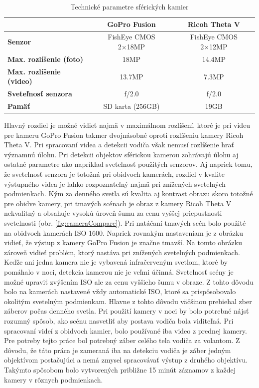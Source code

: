 \documentclass[slovak,master,dept460,male,cpp,cpdeclaration]{diploma}
\begin{document}
\begin{table}[H]
\begin{tabular}{|l|c|c|}
\hline
                                     & \textbf{GoPro Fusion}  & \textbf{Ricoh Theta V} \\ \hline
\textbf{Senzor}                      & FishEye CMOS 2×18MP    & FishEye CMOS 2×12MP    \\ \hline
\textbf{Max. rozlíšenie (foto)}      & 18MP                   & 14.4MP                 \\ \hline
\textbf{Max. rozlíšenie (video)}     & 13.7MP                 & 7.3MP                  \\ \hline
\textbf{Sveteľnosť senzora}          &  f/2.0                 & f/2.0                  \\ \hline
\textbf{Pamäť}                       &  SD karta (256GB)      & 19GB                   \\ \hline
\end{tabular}

	\caption{Technické parametre sférických kamier}
	\label{tab:techSpec}
\end{table}
\newpage
 Hlavný rozdiel je možné vidieť najmä v maximálnom rozlíšení, ktoré je pri videu pre kameru GoPro Fusion takmer dvojnásobné oproti rozlíšeniu kamery Ricoh Theta V. Pri spracovaní videa a detekcii vodiča však nemusí rozlíšenie hrať významnú úlohu. Pri detekcii objektov sférickou kamerou zohrávajú úlohu aj ostatné parametre ako napríklad svetelnosť použitých senzorov. Aj napriek tomu, že svetelnosť senzora je totožná pri obidvoch kamerách, rozdiel v kvalite výstupného videa je ľahko rozpoznateľný najmä pri znížených svetelných podmienkach. Kým za denného svetla sú kvalita aj kontrast obrazu skoro totožné pre obidve kamery, pri tmavých scénach je obraz z kamery Ricoh Theta V nekvalitný a obsahuje vysokú úroveň šumu za cenu vyššej priepustnosti svetelnosti (obr. \ref{fig:cameraCompare}). Pri natáčaní tmavých scén bolo použité na obidvoch kamerách ISO 1600. Napriek rovnakým nastaveniam je z obrázku vidieť, že výstup z kamery GoPro Fusion je značne tmavší. Na tomto obrázku zároveň vidieť problém, ktorý nastáva  pri znížených svetelných podmienkach. Keďže ani jedna kamera nie je vybavená infračerveným svetlom, ktoré by pomáhalo v noci, detekcia kamerou  nie je veľmi účinná. Svetelnosť scény je možné upraviť zvýšením ISO ale za cenu vyššieho šumu v obraze. Z tohto dôvodu bolo na kamerách nastavené vždy automatické ISO, ktoré sa prispôsobovalo okolitým svetelným podmienkam. Hlavne z tohto dôvodu väčšinou prebiehal zber záberov počas denného svetla. Pri  použití kamery v noci by bolo potrebné nájsť rozumný spôsob, ako scénu nasvetliť aby postava vodiča bola viditeľná. Pri spracovaní videí z obidvoch kamier, bolo používané iba video z prednej kamery. Pre potreby tejto práce bol potrebný záber celého tela vodiča za volantom. Z dôvodu, že táto práca je zameraná iba na detekciu vodiča je záber jedným objektívom postačujúci a nemá zmysel spracovávať výstup z druhého objektívu. Takýmto spôsobom bolo vytvorených približne 15 minút záznamov z každej kamery v rôznych podmienkach.
\end{document}
